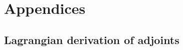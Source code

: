 \documentclass[12pt]{article}
\begin{document}

% 

\newpage
\appendix
\section*{Appendices}
\renewcommand{\thesubsection}{\Alph{subsection}}

\subsection{Lagrangian derivation of adjoints}



\newpage
\printbibliography[heading=bibintoc, title={References}]
\end{document}
